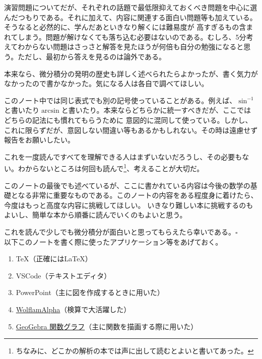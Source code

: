 \documentclass[a4j,dvipdfmx]{jsarticle}
\begin{document}
        演習問題についてだが、それぞれの話題で最低限抑えておくべき問題を中心に選んだつもりである。それに加えて、内容に関連する面白い問題等も加えている。そうなると必然的に、学んだあといきなり解くには難易度が
        高すぎるもの含まれてしまう。問題が解けなくても落ち込む必要はないのである。むしろ、5分考えてわからない問題はさっさと解答を見たほうが何倍も自分の勉強になると思う。ただし、最初から答えを見るのは論外である。

        本来なら、微分積分の発明の歴史も詳しく述べられたらよかったが、書く気力がなかったので書かなかった。気になる人は各自で調べてほしい。

        このノート中では同じ表式でも別の記号使っていることがある。例えば、$\sin^{-1}$と書いたり$\arcsin$と書いたり。本来ならどちらかに統一すべきだが、ここではどちらの記法にも慣れてもらうために
        意図的に混同して使っている。しかし、これに限らずだが、意図しない間違い等もあるかもしれない。その時は遠慮せず報告をお願いしたい。

        これを一度読んですべてを理解できる人はまずいないだろうし、その必要もない。わからないところは何回も読んで\footnote{ちなみに、どこかの解析の本では声に出して読むとよいと書いてあった。}、考えることが大切だ。

        このノートの最後でも述べているが、ここに書かれている内容は今後の数学の基礎となる非常に重要なものである。このノートの内容をある程度身に着けたら、今度はもっと高度な内容に挑戦してほしい。
        いきなり難しい本に挑戦するのもよいし、簡単な本から順番に読んでいくのもよいと思う。
        
        これを読んで少しでも微分積分が面白いと思ってもらえたら幸いである。$\square$\\

        以下このノートを書く際に使ったアプリケーション等をあげておく。
        \begin{enumerate}
            \item \TeX （正確には\LaTeX）
            \item VSCode（テキストエディタ）
            \item PowerPoint（主に図を作成するときに用いた）
            \item \href{https://www.wolframalpha.com/}{WolflamAlpha}（検算で大活躍した）
            \item \href{https://www.geogebra.org/graphing}{GeoGebra 関数グラフ}（主に関数を描画する際に用いた）
        \end{enumerate}

        
\end{document}
